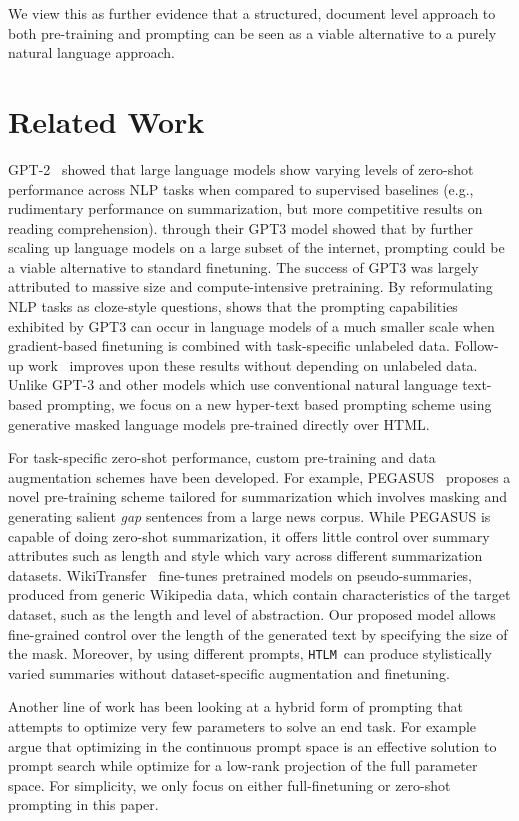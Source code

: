 \documentclass[11pt,a4paper]{article}
\newcommand{\HTLM}{\texttt{HTLM}}
\begin{document}
We view this as further evidence that a structured, document level approach to both pre-training and prompting can be seen as a viable alternative to a purely natural language approach.

\section{Related Work}
GPT-2~\cite{GPT2} showed that large language models show varying levels of zero-shot performance across NLP tasks when compared to supervised baselines (e.g., rudimentary performance on summarization, but more competitive results on reading comprehension). 
\citet{gpt3} through their GPT3 model showed that by further scaling up language models on a large subset of the internet, prompting could be a viable alternative to standard finetuning. The success of GPT3 was largely attributed to massive size and compute-intensive pretraining. By reformulating NLP tasks as cloze-style questions, \citet{itsnotjustsize}  shows that the prompting capabilities exhibited by GPT3 can occur in language models of a much smaller scale when gradient-based finetuning is combined with task-specific unlabeled data. Follow-up work~\cite{adapet} improves upon these results without depending on unlabeled data. Unlike GPT-3 and other models which use conventional natural language text-based prompting, we focus on a new hyper-text based prompting scheme using generative masked language models pre-trained directly over HTML. 

For task-specific zero-shot performance, custom pre-training and data augmentation schemes have been developed. For example, PEGASUS~\citep{pegasus} proposes a novel pre-training scheme tailored for summarization which involves masking and generating salient \emph{gap} sentences from a large news corpus. While PEGASUS is capable of doing zero-shot summarization, it offers little control over summary attributes such as length and style which vary across different summarization datasets. 
WikiTransfer~\cite{Fabbri2021ImprovingZA}  fine-tunes pretrained models on pseudo-summaries, produced from generic Wikipedia data, which contain characteristics of the target dataset, such as the length and level of abstraction.
Our proposed model allows fine-grained control over the length of the generated text by specifying the size of the mask. Moreover, by using different prompts, \HTLM~can produce stylistically varied summaries without dataset-specific augmentation and finetuning. 

Another line of work has been looking at a hybrid form of prompting that attempts to optimize very few parameters to solve an end task. For example \citet{prefixtuning} argue that optimizing in the continuous prompt space is an effective solution to prompt search while \citet{intrinsic_dimensionality_finetuning} optimize for a low-rank projection of the full parameter space. For simplicity, we only focus on either full-finetuning or zero-shot prompting in this paper.
\end{document}
